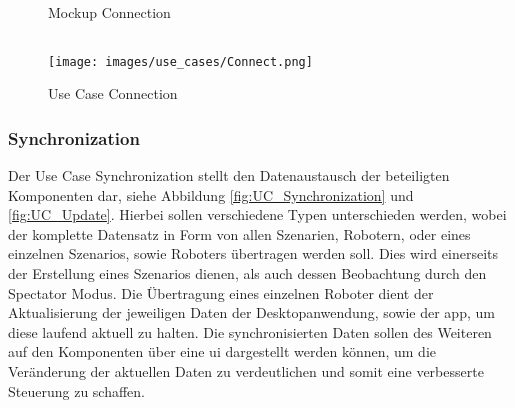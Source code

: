 \begin{figure}[h]
	\centering
	\qquad
	\caption{Mockup Connection}
\end{figure}
\newpage
\begin{verbatim}
\end{verbatim}
\begin{figure}[h]
	\begin{center}
		\texttt{[image: images/use\_cases/Connect.png]}
	\end{center}
	\caption{Use Case Connection}
	\label{fig:UC_Connect}
\end{figure}

\newpage
\subsubsection{Synchronization}

Der Use Case Synchronization stellt den Datenaustausch der beteiligten Komponenten dar, siehe Abbildung \eqref{fig:UC_Synchronization} und \eqref{fig:UC_Update}. Hierbei sollen verschiedene Typen unterschieden werden, wobei der komplette Datensatz in Form von allen Szenarien, Robotern, oder eines einzelnen Szenarios, sowie Roboters übertragen werden soll. Dies wird einerseits der Erstellung eines Szenarios dienen, als auch dessen Beobachtung durch den Spectator Modus. Die Übertragung eines einzelnen Roboter dient der Aktualisierung der jeweiligen Daten der Desktopanwendung, sowie der \gls{app}, um diese laufend aktuell zu halten. Die synchronisierten Daten sollen des Weiteren auf den Komponenten über eine \gls{ui} dargestellt werden können, um die Veränderung der aktuellen Daten zu verdeutlichen und somit eine verbesserte Steuerung zu schaffen.\\

